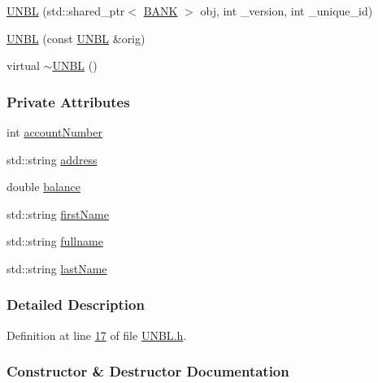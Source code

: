 \begin{DoxyCompactItemize}
\item 
\hyperlink{class_u_n_b_l_abbd578fbd58cf6f2143f17b3011f6c21_abbd578fbd58cf6f2143f17b3011f6c21}{U\+N\+BL} (std\+::shared\+\_\+ptr$<$ \hyperlink{class_b_a_n_k}{B\+A\+NK} $>$ obj, int \+\_\+version, int \+\_\+unique\+\_\+id)
\item 
\hyperlink{class_u_n_b_l_aca7a99d7308d5d8dd5841a0eeeed0852_aca7a99d7308d5d8dd5841a0eeeed0852}{U\+N\+BL} (const \hyperlink{class_u_n_b_l}{U\+N\+BL} \&orig)
\item 
virtual \hyperlink{class_u_n_b_l_a32d405e6e9adfab1ffdeec6406f9e72f_a32d405e6e9adfab1ffdeec6406f9e72f}{$\sim$\+U\+N\+BL} ()
\end{DoxyCompactItemize}
\subsubsection*{Private Attributes}
\begin{DoxyCompactItemize}
\item 
int \hyperlink{class_u_n_b_l_a90763c3044159862bcb9cd51d6b09f34_a90763c3044159862bcb9cd51d6b09f34}{account\+Number}
\item 
std\+::string \hyperlink{class_u_n_b_l_acdaf39211e9b9c190a69bbbc590543e3_acdaf39211e9b9c190a69bbbc590543e3}{address}
\item 
double \hyperlink{class_u_n_b_l_afbe674996d7fddaffb55654e6a79f03b_afbe674996d7fddaffb55654e6a79f03b}{balance}
\item 
std\+::string \hyperlink{class_u_n_b_l_acee1595bf1914ac220f7c810b174bd16_acee1595bf1914ac220f7c810b174bd16}{first\+Name}
\item 
std\+::string \hyperlink{class_u_n_b_l_a67deb62f553fe1ece6feb73f12898e7a_a67deb62f553fe1ece6feb73f12898e7a}{fullname}
\item 
std\+::string \hyperlink{class_u_n_b_l_a3f42790177cbe310536f53a7369ee194_a3f42790177cbe310536f53a7369ee194}{last\+Name}
\end{DoxyCompactItemize}


\subsubsection{Detailed Description}


Definition at line \hyperlink{_u_n_b_l_8h_source_l00017}{17} of file \hyperlink{_u_n_b_l_8h_source}{U\+N\+B\+L.\+h}.



\subsubsection{Constructor \& Destructor Documentation}
